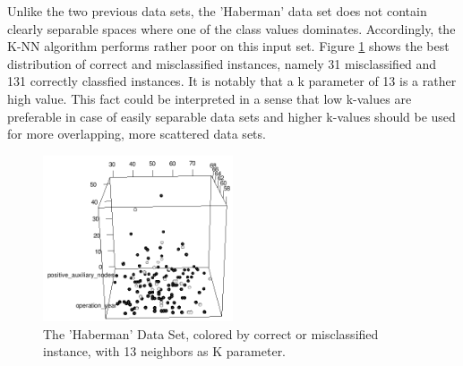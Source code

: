 \documentclass[paper=a4, fontsize=11pt]{scrartcl} %
\numberwithin{equation}{section} %
\numberwithin{figure}{section} %
\numberwithin{table}{section} %
\begin{document}
Unlike the two previous data sets, the 'Haberman' data set does not contain clearly separable spaces where one of the class values dominates. Accordingly, the K-NN algorithm performs rather poor on this input set. Figure \ref{fig:haberman:correct:k13} shows the best distribution of correct and misclassified instances, namely 31 misclassified and 131 correctly classfied instances. It is notably that a k parameter of 13 is a rather high value. This fact could be interpreted in a sense that low k-values are preferable in case of easily separable data sets and higher k-values should be used for more overlapping, more scattered data sets.
\begin{figure}[0.5\textwidth]
    \begin{center}
\includegraphics[width=0.5\textwidth]{Haberman_correct_k13}
    \end{center}
\caption['Haberman' correctness with k=13]{The 'Haberman' Data Set, colored by correct or misclassified instance, with 13 neighbors as K parameter.}
\label{fig:haberman:correct:k13}
\end{figure}
\end{document}
